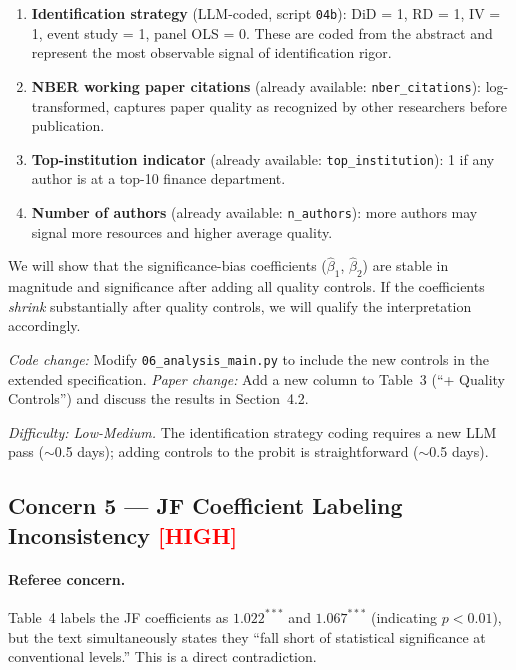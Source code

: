 \documentclass[12pt]{article}
\newcommand{\HIGH}{\textcolor{red}{\textbf{[HIGH]}}}
\begin{document}
\begin{enumerate}
  \item \textbf{Identification strategy} (LLM-coded, script
        \texttt{04b}): DiD = 1, RD = 1, IV = 1, event study = 1, panel OLS
        = 0.  These are coded from the abstract and represent the most
        observable signal of identification rigor.

  \item \textbf{NBER working paper citations} (already available:
        \texttt{nber\_citations}): log-transformed, captures paper quality as
        recognized by other researchers before publication.

  \item \textbf{Top-institution indicator} (already available:
        \texttt{top\_institution}): 1 if any author is at a top-10 finance
        department.

  \item \textbf{Number of authors} (already available: \texttt{n\_authors}):
        more authors may signal more resources and higher average quality.
\end{enumerate}

We will show that the significance-bias coefficients ($\hat\beta_1$,
$\hat\beta_2$) are stable in magnitude and significance after adding all
quality controls.  If the coefficients \textit{shrink} substantially after
quality controls, we will qualify the interpretation accordingly.

\textit{Code change:} Modify \texttt{06\_analysis\_main.py} to include
the new controls in the extended specification.
\textit{Paper change:} Add a new column to Table~3 (``+ Quality Controls'')
and discuss the results in Section~4.2.

\textit{Difficulty: Low-Medium.}  The identification strategy coding requires
a new LLM pass ($\sim$0.5 days); adding controls to the probit is
straightforward ($\sim$0.5 days).

\subsection{Concern 5 --- JF Coefficient Labeling Inconsistency \HIGH}

\paragraph{Referee concern.}
Table~4 labels the JF coefficients as $1.022^{***}$ and $1.067^{***}$
(indicating $p < 0.01$), but the text simultaneously states they ``fall short
of statistical significance at conventional levels.''  This is a direct
contradiction.
\end{document}
